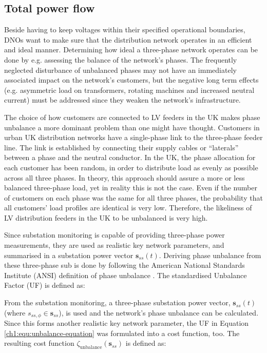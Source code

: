 

\subsection{Total power flow}
\label{ch1:subsec:total-power-flow}

Beside having to keep voltages within their specified operational boundaries, DNOs want to make sure that the distribution network operates in an efficient and ideal manner.
Determining how ideal a three-phase network operates can be done by e.g. assessing the balance of the network's phases.
The frequently neglected disturbance of unbalanced phases may not have an immediately associated impact on the network's customers, but the negative long term effects (e.g. asymmetric load on transformers, rotating machines and increased neutral current) must be addressed since they weaken the network's infrastructure.

The choice of how customers are connected to LV feeders in the UK makes phase unbalance a more dominant problem than one might have thought.
Customers in urban UK distribution networks have a single-phase link to the three-phase feeder line.
The link is established by connecting their supply cables or ``laterals'' between a phase and the neutral conductor.
In the UK, the phase allocation for each customer has been random, in order to distribute load as evenly as possible across all three phases.
In theory, this approach should assure a more or less balanced three-phase load, yet in reality this is not the case.
Even if the number of customers on each phase was the same for all three phases, the probability that all customers' load profiles are identical is very low.
Therefore, the likeliness of LV distribution feeders in the UK to be unbalanced is very high.

Since substation monitoring is capable of providing three-phase power measurements, they are used as realistic key network parameters, and summarised in a substation power vector $\textbf{s}_{ss}(t)$.
Deriving phase unbalance from these three-phase sub is done by following the American National Standards Institute (ANSI) definition of phase unbalance \cite{ANSI-MB-1-2011}.
The standardised Unbalance Factor (UF) is defined as:



From the substation monitoring, a three-phase substation power vector, $\textbf{s}_{ss}(t)$ (where $s_{ss,\phi} \in \textbf{s}_{ss}$), is used and the network's phase unbalance can be calculated.
Since this forms another realistic key network parameter, the UF in Equation \ref{ch1:equ:unbalance-equation} was formulated into a cost function, too.
The resulting cost function $\zeta_\text{unbalance}(\textbf{s}_{ss})$ is defined as:

